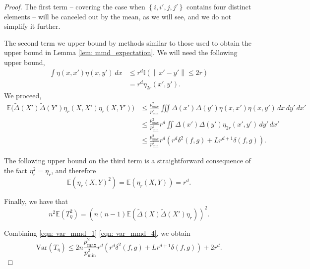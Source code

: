 \documentclass{article}
\newcommand{\norm}[1]{\left\lVert#1\right\rVert}
\newcommand{\set}[1]{\left\{#1\right\}}
\newcommand{\Var}{\mathrm{Var}}
\newcommand{\1}{\mathbb{I}}
\newcommand{\Ebb}{\mathbb{E}}
\newcommand{\dx}{\,dx}
\newcommand{\dxpr}{\,dx'}
\newcommand{\dypr}{\,dy'}
\newcommand{\wt}[1]{\widetilde{#1}}
\theoremstyle{alden}
\theoremstyle{aldenthm}
\theoremstyle{definition}
\theoremstyle{remark}
\begin{document}
\begin{proof}
	The first term -- covering the case when $\set{i,i',j,j'}$ contains four distinct elements --  will be canceled out by the mean, as we will see, and we do not simplify it further. 
	
	The second term we upper bound by methods similar to those used to obtain the upper bound in Lemma \ref{lem: mmd_expectation}. We will need the following upper bound,
	\begin{align*}
	\int \eta(x,x') \eta(x,y') \dx & \leq r^d \1(\norm{x' - y'} \leq 2r) \\
	& = r^d \eta_{2r}(x',y').
	\end{align*}
	We proceed,
	\begin{align}
	\label{eqn: var_mmd_2}
	\Ebb \biggl(\widetilde{\Delta}(X') \wt{\Delta}(Y') \eta_r(X,X') \eta_r(X,Y') \biggr) & \leq \frac{p_{\max}^2}{p_{\min}^2} \iiint \Delta(x') \Delta(y') \eta(x,x') \eta(x,y') \dx \dypr \dxpr \nonumber\\
	& \leq \frac{p_{\max}^2}{p_{\min}^2} r^d \iint \Delta(x') \Delta(y') \eta_{2r}(x',y') \dypr \dxpr \nonumber \\
	& \leq \frac{p_{\max}^2}{p_{\min}^2} r^d \left(r^d \delta^2(f,g) + Lr^{d+1}\delta(f,g)\right).
	\end{align}
	
	The following upper bound on the third term is a straightforward consequence of the fact $\eta_r^2 = \eta_r$, and therefore
	\begin{equation}
	\label{eqn: var_mmd_3}
	\Ebb(\eta_r(X,Y)^2) = \Ebb(\eta_r(X,Y)) = r^d. 
	\end{equation}
	
	Finally, we have that
	\begin{equation}
	\label{eqn: var_mmd_4}
	n^2 \Ebb(T_{\eta}^2) = \left(n(n-1) \Ebb(\widetilde{\Delta}(X) \wt{\Delta}(X') \eta_r) \right)^2 .
	\end{equation}
	
	Combining \eqref{eqn: var_mmd_1}-\eqref{eqn: var_mmd_4}, we obtain
	\begin{equation*}
	\Var(T_\eta) \leq 2n \frac{p_{\max}^2}{p_{\min}^2} r^d \left(r^d \delta^2(f,g) + Lr^{d+1}\delta(f,g)\right) + 2r^d.
	\end{equation*}
\end{proof}
\end{document}
